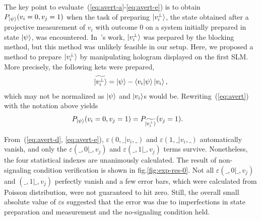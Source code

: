 \documentclass[pra,aps,notitlepage,superscriptaddress,showpacs,showkeys]{revtex4-1}
\theoremstyle{definition}
\theoremstyle{remark}
\begin{document}
 The key point to evaluate~(\ref{eq:avert-a}-\ref{eq:avert-e}) is to obtain $P_{\ket{\psi}} (v_i = 0, v_j = 1)$ when the task of preparing $\ket{v_i^\perp}$, the state obtained after a projective measurement of $v_i$ with outcome 0 on a system initially prepared in state $\ket{\psi}$, was encountered. In~\cite{yxiao17s}'s work, $\ket{v_i^\perp}$ was prepared by the blocking method, but this method was unlikely feasible in our setup. 
 Here, we proposed a method to prepare $\ket{v_i^\perp}$ by manipulating hologram displayed on the first SLM. More precisely, the following kets were prepared,
    \begin{align}
        \widetilde{\ket{v_i^\perp}} = \ket{\psi} - \braket{v_i|\psi}\ket{v_i},
    \end{align}
 which may not be normalized as $\ket{\psi}$ and $\ket{v_i}$s would be. Rewriting~(\ref{eq:avert}) with the notation above yields
    \begin{align}
        P_{\ket{\psi}} (v_i = 0, v_j = 1) &= P_{\widetilde{\ket{v_i^\perp}}} (v_j = 1).
    \end{align}


 From~(\ref{eq:avert-d}, \ref{eq:avert-e}), $\varepsilon(0, \_|v_i, \_)$ and $\varepsilon(1, \_|v_i, \_)$ automatically vanish, and only the $\varepsilon(\_, 0|\_, v_j)$ and $\varepsilon(\_, 1|\_, v_j)$ terms survive. Nonetheless, the four statistical indexes are unanimously calculated.
 The result of non-signaling condition verification is shown in fig.\ref{fig:exp-res-0}. Not all $\varepsilon(\_, 0|\_, v_j)$ and $(\_, 1|\_, v_j)$ perfectly vanish and a few error bars, which were calculated from Poisson distribution, were not guaranteed to hit zero.
 Still, the overall small absolute value of $\varepsilon$s suggested that the error was due to imperfections in state preparation and measurement and the no-signaling condition held.
\end{document}
